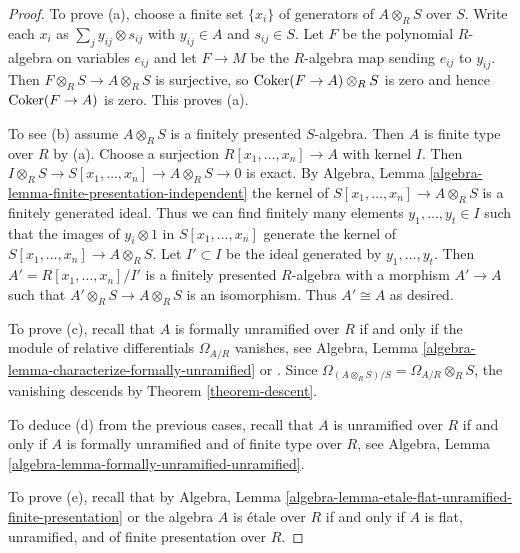 \begin{proof}
To prove (a), choose a finite set $\{x_i\}$ of generators of $A \otimes_R S$
over $S$. Write each $x_i$ as $\sum_j y_{ij} \otimes s_{ij}$ with
$y_{ij} \in A$ and $s_{ij} \in S$. Let $F$ be the polynomial $R$-algebra
on variables $e_{ij}$ and let $F \to M$ be the $R$-algebra map sending
$e_{ij}$ to $y_{ij}$. Then $F \otimes_R S\to A \otimes_R S$ is surjective, so
$\mathop{\mathrm{Coker}}(F \to A) \otimes_R S$ is zero and hence $\mathop{\mathrm{Coker}}(F \to A)$
is zero. This proves (a).

\medskip\noindent
To see (b) assume $A \otimes_R S$ is a finitely presented $S$-algebra.
Then $A$ is finite type over $R$ by (a). Choose a surjection
$R[x_1, \ldots, x_n] \to A$ with kernel $I$.
Then $I \otimes_R S \to S[x_1, \ldots, x_n] \to A \otimes_R S \to 0$ is exact.
By Algebra, Lemma \ref{algebra-lemma-finite-presentation-independent}
the kernel of $S[x_1, \ldots, x_n] \to A \otimes_R S$
is a finitely generated ideal. Thus we can find finitely many elements
$y_1, \ldots, y_t \in I$ such that the images of $y_i \otimes 1$ in
$S[x_1, \ldots, x_n]$ generate the kernel of
$S[x_1, \ldots, x_n] \to A \otimes_R S$.
Let $I' \subset I$ be the ideal generated by $y_1, \ldots, y_t$.
Then $A' = R[x_1, \ldots, x_n]/I'$ is a finitely presented $R$-algebra
with a morphism $A' \to A$ such that $A' \otimes_R S \to A \otimes_R S$
is an isomorphism. Thus $A' \cong A$ as desired.

\medskip\noindent
To prove (c), recall that $A$ is formally unramified over $R$ if and only
if the module of relative differentials $\Omega_{A/R}$ vanishes, see
Algebra, Lemma \ref{algebra-lemma-characterize-formally-unramified} or
\cite[Proposition~17.2.1]{EGA4}.
Since $\Omega_{(A \otimes_R S)/S} = \Omega_{A/R} \otimes_R S$,
the vanishing descends by Theorem \ref{theorem-descent}.

\medskip\noindent
To deduce (d) from the previous cases, recall that $A$ is unramified
over $R$ if and only if $A$ is formally unramified and of finite type
over $R$, see
Algebra, Lemma \ref{algebra-lemma-formally-unramified-unramified}.

\medskip\noindent
To prove (e), recall that by
Algebra, Lemma \ref{algebra-lemma-etale-flat-unramified-finite-presentation}
or \cite[Th\'eor\`eme~17.6.1]{EGA4} the algebra
$A$ is \'etale over $R$ if and only if
$A$ is flat, unramified, and of finite presentation over $R$.
\end{proof}


